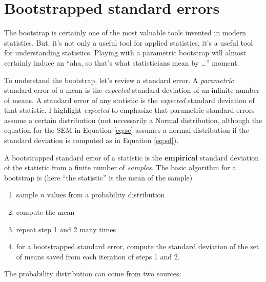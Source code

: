 \documentclass[]{book}
\providecommand{\tightlist}{%
  \setlength{\itemsep}{0pt}\setlength{\parskip}{0pt}}
\begin{document}
\hypertarget{bootstrap}{%
\section{Bootstrapped standard errors}\label{bootstrap}}

The bootstrap is certainly one of the most valuable tools invented in modern statistics. But, it's not only a useful tool for applied statistics, it's a useful tool for understanding statistics. Playing with a parametric bootstrap will almost certainly induce an ``aha, so that's what statisticians mean by \ldots{}'' moment.

To understand the bootstrap, let's review a standard error. A \emph{parametric} standard error of a mean is the \emph{expected} standard deviation of an infinite number of means. A standard error of any statistic is the \emph{expected} standard deviation of that statistic. I highlight \emph{expected} to emphasize that parametric standard errors assume a certain distribution (not necessarily a Normal distribution, although the equation for the SEM in Equation \eqref{eq:se} assumes a normal distribution if the standard deviation is computed as in Equation \eqref{eq:sd}).

A bootstrapped standard error of a statistic is the \textbf{empirical} standard deviation of the statistic from a finite number of \emph{samples}. The basic algorithm for a bootstrap is (here ``the statistic'' is the mean of the sample)

\begin{enumerate}
\def\labelenumi{\arabic{enumi}.}
\tightlist
\item
  sample \(n\) values from a probability distribution
\item
  compute the mean
\item
  repeat step 1 and 2 many times
\item
  for a bootstrapped standard error, compute the standard deviation of the set of means saved from each iteration of steps 1 and 2.
\end{enumerate}

The probability distribution can come from two sources:
\end{document}
